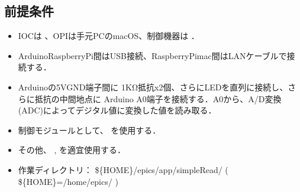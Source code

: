 \documentclass[letterpaper,10pt,dvipdfmx]{sphinxmanual}
\begin{document}
\subsection{前提条件}
\label{\detokenize{epics/rst/example2__arduino_ADConvertor:id2}}\begin{itemize}
\item {} 
IOCは  、OPIは手元PCのmacOS、制御機器は  ．

\item {} 
Arduino\sphinxhyphen{}RaspberryPi間はUSB接続、RaspberryPi\sphinxhyphen{}mac間はLANケーブルで接続する．

\item {} 
Arduinoの5V\sphinxhyphen{}GND端子間に 1KΩ抵抗x2個、さらにLEDを直列に接続し、さらに抵抗の中間地点に Arduino A0端子を接続する．A0から、A/D変換(ADC)によってデジタル値に変換した値を読み取る．

\item {} 
制御モジュールとして、  を使用する．

\item {} 
その他、  ,  を適宜使用する．

\item {} 
作業ディレクトリ： \$\{HOME\}/epics/app/simpleRead/  ( \$\{HOME\}=/home/epics/ )

\end{itemize}
\end{document}
